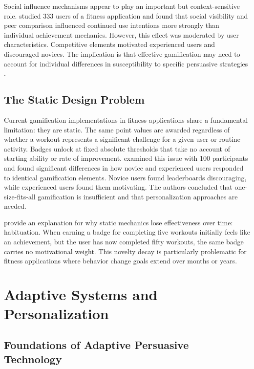 \documentclass[12pt, a4paper]{report}
\begin{document}
Social influence mechanisms appear to play an important but context-sensitive role. \citet{hamari2015} studied 333 users of a fitness application and found that social visibility and peer comparison influenced continued use intentions more strongly than individual achievement mechanics. However, this effect was moderated by user characteristics. Competitive elements motivated experienced users and discouraged novices. The implication is that effective gamification may need to account for individual differences in susceptibility to specific persuasive strategies \citep{kaptein2015}.

\subsection{The Static Design Problem}

Current gamification implementations in fitness applications share a fundamental limitation: they are static. The same point values are awarded regardless of whether a workout represents a significant challenge for a given user or routine activity. Badges unlock at fixed absolute thresholds that take no account of starting ability or rate of improvement. \citet{kari2016} examined this issue with 100 participants and found significant differences in how novice and experienced users responded to identical gamification elements. Novice users found leaderboards discouraging, while experienced users found them motivating. The authors concluded that one-size-fits-all gamification is insufficient and that personalization approaches are needed.

\citet{mitchell2020} provide an explanation for why static mechanics lose effectiveness over time: habituation. When earning a badge for completing five workouts initially feels like an achievement, but the user has now completed fifty workouts, the same badge carries no motivational weight. This novelty decay is particularly problematic for fitness applications where behavior change goals extend over months or years.

\section{Adaptive Systems and Personalization}

\subsection{Foundations of Adaptive Persuasive Technology}
\end{document}
